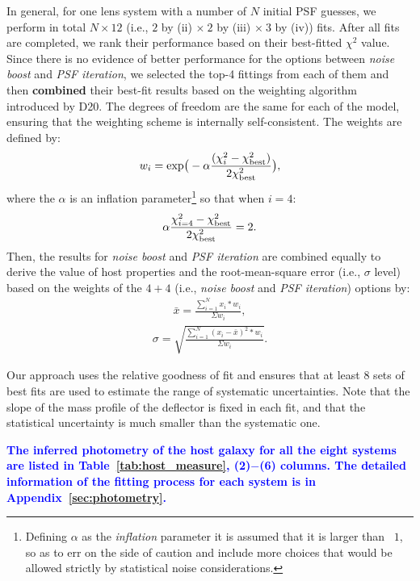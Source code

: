\documentclass[fleqn,usenatbib]{mnras}
\newcommand{\blue}[1]{{\bf \textcolor{blue}{#1}}}
\begin{document}
In general, for one lens system with a number of $N$ initial PSF guesses, we perform in total $N\times12$ (i.e., $2$ by (ii) $\times~2$ by (iii) $\times~3$ by (iv)) fits. After all fits are completed, we rank their performance based on their best-fitted $\chi^2$ value. Since there is no evidence of better performance for the options between {\it noise boost} and {\it PSF iteration}, we selected the top-4 fittings from each of them and then {\bf combined} their best-fit results based on the weighting algorithm introduced by D20. The degrees of freedom are the same for each of the model, ensuring that the weighting scheme is internally self-consistent. The weights are defined by:
\begin{eqnarray}
\label{eq:weights}
w_i = {\rm exp} \big(- \alpha \frac{ (\chi_i ^2 - \chi_{\rm best} ^2 )}{2 \chi_{\rm best} ^2} \big),
\end{eqnarray} 
where the $\alpha$ is an inflation parameter\footnote{Defining $\alpha$ as the {\it inflation} parameter it is assumed that it is larger than ~$1$, so as to err on the side of caution and include more choices that would be allowed strictly by statistical noise considerations.} so that when $i=4$:
\begin{eqnarray}
\label{eq:alpha}
\alpha \frac{ \chi_{i=4} ^2 - \chi_{\rm best} ^2 }{2 \chi_{\rm best} ^2} = 2.
\end{eqnarray} 
Then, the results for {\it noise boost} and {\it PSF iteration} are combined equally to derive the value of host properties and the root-mean-square error (i.e., $\sigma$ level) based on the weights of the $4+4$ (i.e., {\it noise boost} and {\it PSF iteration}) options by:
\begin{eqnarray}
\label{eq:infer_value}
\bar{x}  =  \frac{  \sum_{i=1}^{N}   x_i * w_i  }{\Sigma w_i} ,
\end{eqnarray} 
\begin{eqnarray}
\label{eq:infer_scatter}
\sigma =   \sqrt{ \frac{  \sum_{i=1}^{N}   (x_i -  \bar{x} ) ^2 * w_i  }{\Sigma w_i} }.
\end{eqnarray} 

Our approach uses the relative goodness of fit and ensures that at least 8 sets of best fits are used to estimate the range of systematic uncertainties. Note that the slope of the mass profile of the deflector is fixed in each fit, and that the statistical uncertainty is much smaller than the systematic one. 

\blue{The inferred photometry of the host galaxy for all the eight systems are listed in Table~\ref{tab:host_measure}, (2)$-$(6) columns. The detailed information of the fitting process for each system is in Appendix~\ref{sec:photometry}.}
\end{document}
